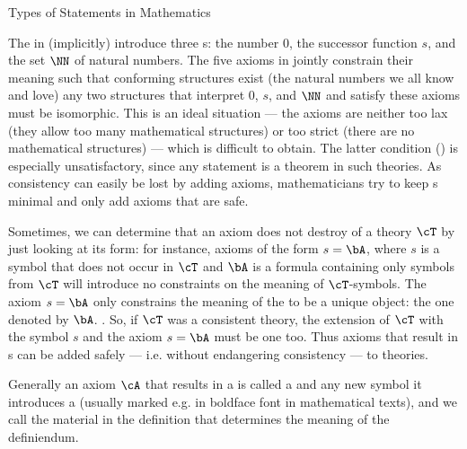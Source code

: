 \begin{omgroup}[short=Mathematical Statements,id=statements]
\begin{omgroup}[id=statements-constitutive]{Types of Statements in Mathematics}
\begin{module}[id=statementtypes]
\begin{omtext}
The {} in {} (implicitly) introduce three
{s}: the number 0, the successor function $s$, and the set $\NN$ of
natural numbers. The five axioms in {} jointly constrain their meaning
such that conforming structures exist (the natural numbers we all know and love) any two
structures that interpret 0, $s$, and $\NN$ and satisfy these axioms must be isomorphic.
This is an ideal situation --- the axioms are neither too lax (they allow too many
mathematical structures) or too strict (there are no mathematical structures) --- which is
difficult to obtain. The latter condition () is
especially unsatisfactory, since any statement is a theorem in such theories. As
consistency can easily be lost by adding axioms, mathematicians try to keep
{s} minimal and only add axioms that are safe.
\end{omtext}

\begin{omtext}
  Sometimes, we can determine that an axiom does not destroy {} of a
  theory $\cT$ by just looking at its form: for instance, axioms of the form $s=\bA$,
  where $s$ is a symbol that does not occur in $\cT$ and $\bA$ is a formula containing
  only symbols from $\cT$ will introduce no constraints on the meaning of
  $\cT$-symbols. The axiom $s=\bA$ only constrains the meaning of the
  {} to be a unique object: the one denoted by $\bA$. . So, if $\cT$ was a
  consistent theory, the extension of $\cT$ with the symbol $s$ and the axiom $s=\bA$ must
  be one too. Thus axioms that result in {s} can be added
  safely --- i.e. without endangering consistency --- to theories.
\end{omtext}

\begin{definition}[display=flow,id=conservative-extension.def]
  Generally an axiom $\cA$ that results in a {} is called
  a {} and any new symbol it introduces a {} (usually
  marked e.g. in boldface font in mathematical texts), and we call {} the
  material in the definition that determines the meaning of the definiendum.
\end{definition}
\end{module}
\end{omgroup}


\end{omgroup}
